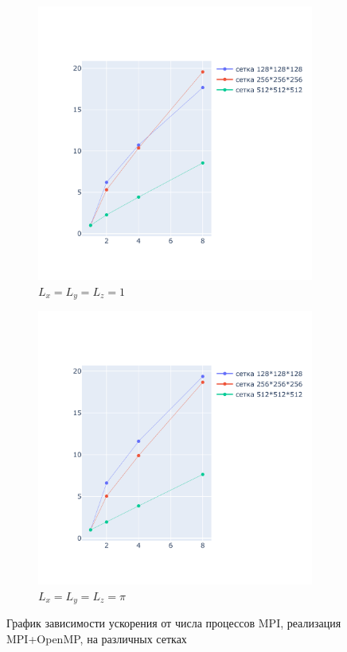 \documentclass{article}
\begin{document}
\begin{figure}[!t]
\centering
\begin{subfigure}[b]{0.49\textwidth}
    \centering
    \includegraphics[width=\textwidth,trim=0 0 0 0,clip]{omp_l_0.pdf}
    \caption{\(L_x=L_y=L_z=1\)}
    \label{img:1.1}
\end{subfigure}
\begin{subfigure}[b]{0.49\textwidth}
    \centering
    \includegraphics[width=\textwidth,trim=0 0 0 0,clip]{omp_l_1.pdf}
    \caption{\(L_x=L_y=L_z=\pi\)}
    \label{img:1.2}
\end{subfigure}
\caption{График зависимости ускорения от числа процессов MPI, реализация MPI+OpenMP, на различных сетках}
\end{figure}
\end{document}
